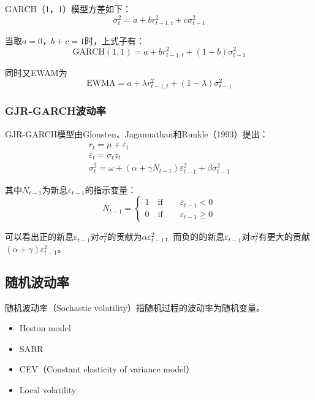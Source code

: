 \documentclass[11pt]{article}
\begin{document}
GARCH（1，1）模型方差如下：
\begin{equation*}
    \sigma^{2}_{t} = a + b r^{2}_{t-1,t} + c \sigma^{2}_{t-1}
\end{equation*}

当取$a=0$，$b+c=1$时，上式子有：
\begin{equation*}
    \text{GARCH}(1,1) = a + b r^{2}_{t-1,t} + (1-b) \sigma^{2}_{t-1}
\end{equation*}

同时又EWAM为
\begin{equation*}
    \text{EWMA} = a + \lambda r^{2}_{t-1,t} + (1-\lambda) \sigma^{2}_{t-1}
\end{equation*}

\subsubsection{GJR-GARCH波动率}

GJR-GARCH模型由Glonsten、Jagannathan和Runkle（1993）提出：
\begin{gather*}
    r_t = \mu + \varepsilon_t \\
    \varepsilon_t = \sigma_t z_t \\
    \sigma^2_t = \omega + \left( \alpha + \gamma N_{t-1} \right) \varepsilon_{t-1}^2 + \beta \sigma_{t-1}^2
\end{gather*}

其中$N_{t-1}$为新息$\varepsilon_{t-1}$的指示变量：
\begin{equation*}
    N_{t-1} = 
    \begin{cases}
        1 \quad\text{if}\qquad \varepsilon_{t-1} < 0 \\
        0 \quad\text{if}\qquad \varepsilon_{t-1} \geq 0
    \end{cases}
\end{equation*}

可以看出正的新息$\varepsilon_{t-1}$对$\sigma_t^2$的贡献为$\alpha \varepsilon_{t-1}^2$，而负的的新息$\varepsilon_{t-1}$对$\sigma_t^2$有更大的贡献$\left(\alpha+\gamma\right) \varepsilon_{t-1}^2$。

\subsection{随机波动率}

随机波动率（Sochastic volatility）指随机过程的波动率为随机变量。
\begin{itemize}
    \item Heston model
    \item SABR
    \item CEV（Constant elasticity of variance model）
    \item Local volatility
\end{itemize}
\end{document}
